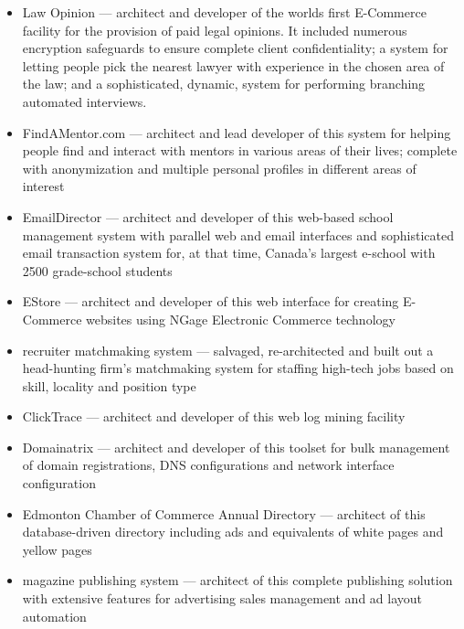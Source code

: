 \begin{resume}
\begin{position}
\begin{itemize}
\item Law Opinion --- architect and developer of the worlds
                        first E-Commerce facility for the provision of 
                        paid legal opinions.  
                        It included numerous encryption safeguards 
                        to ensure complete client confidentiality; a
                        system for letting people pick the nearest
                        lawyer with experience in the chosen area of
                        the law;  and a sophisticated, dynamic,
                        system for performing branching automated interviews.
\item FindAMentor.com --- architect and lead developer of this system
                    for helping people find and interact with mentors in
		    various areas of their lives; complete with anonymization and
		    multiple personal profiles in different areas of interest
\item EmailDirector --- architect and developer of this web-based school management 
                        system with parallel web and email interfaces
                        and sophisticated email transaction system for,
                        at that time, Canada's largest e-school
                        with 2500 grade-school students
\item EStore --- architect and developer of this web interface for creating E-Commerce
                 websites using NGage Electronic Commerce technology
\item recruiter matchmaking system --- salvaged, re-architected and built out a head-hunting firm's
                   matchmaking system for staffing high-tech jobs based on skill, locality
                   and position type
\item ClickTrace --- architect and developer of this web log mining facility
\item Domainatrix --- architect and developer of this 
                      toolset for bulk management of domain registrations, 
                      DNS configurations and network interface
                      configuration
\item Edmonton Chamber of Commerce Annual Directory ---
         architect of this database-driven directory 
         including ads and equivalents of white pages and yellow pages
\item magazine publishing system ---
  architect of this complete publishing solution 
  with extensive features for advertising sales management and ad layout automation


\end{itemize}
\end{position}
\end{resume}
